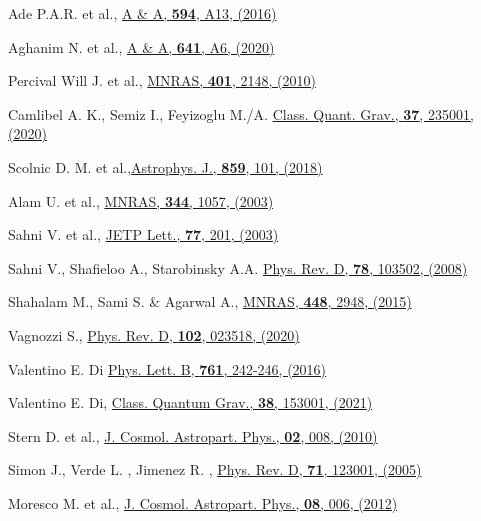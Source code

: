 \begin{thebibliography}{99}
  Ade P.A.R. et al., \href{	https://doi.org/10.1051/0004-6361/201525830}{A \& A, \textbf{594}, A13, (2016)}

  Aghanim N. et al., \href{	https://doi.org/10.1051/0004-6361/201833910}{A \& A, \textbf{641}, A6, (2020)}

 Percival Will J. et al., \href{https://doi.org/10.1111/j.1365-2966.2009.15812.x}{MNRAS, \textbf{401}, 2148, (2010)}

 Camlibel A. K., Semiz I., Feyizoglu M./A. \href{https://doi.org/10.1088/1361-6382/abba48}{Class. Quant. Grav., \textbf{37}, 235001, (2020)}

 Scolnic D. M. et al.,\href{https://doi.org/10.3847/1538-4357/aab9bb}{Astrophys. J., \textbf{859}, 101, (2018)}

 Alam U. et al., \href{https://doi.org/10.1046/j.1365-8711.2003.06871.x}{MNRAS, \textbf{344}, 1057, (2003)}

 Sahni V. et al., \href{https://doi.org/10.1134/1.1574831}{JETP Lett., \textbf{77}, 201, (2003)}

 Sahni V., Shafieloo A., Starobinsky A.A. \href{https://doi.org/10.1103/PhysRevD.78.103502}{Phys. Rev. D, \textbf{78}, 103502, (2008)}


 Shahalam M., Sami S. \& Agarwal A., \href{https://doi.org/10.1093/mnras/stv083}{MNRAS, \textbf{448}, 2948, (2015)}

  Vagnozzi S., \href{https://doi.org/10.1103/PhysRevD.102.023518}{Phys. Rev. D, \textbf{102}, 023518, (2020)}

 Valentino E. Di \href{https://doi.org/10.1016/j.physletb.2016.08.043}{Phys. Lett. B, \textbf{761}, 242-246, (2016)}

 Valentino E. Di, \href{https://doi.org/10.1088/1361-6382/ac086d}{Class. Quantum Grav., \textbf{38}, 153001, (2021)}

 Stern D. et al., \href{https://doi.org/10.1088/1475-7516/2010/02/008}
{J. Cosmol. Astropart. Phys., \textbf{02}, 008, (2010)}

 Simon J., Verde L. , Jimenez R. , \href{https://doi.org/10.1103/PhysRevD.71.123001}%
{Phys. Rev. D, \textbf{71}, 123001, (2005)}

 Moresco M. et al., \href{https://doi.org/10.1088/1475-7516/2012/08/006}%
{J. Cosmol. Astropart. Phys., \textbf{08}, 006, (2012)}


\end{thebibliography}
